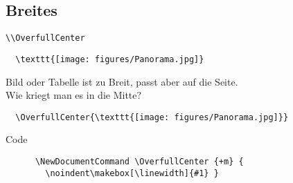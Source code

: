 \subsection{Breites}

\begin{frame}[fragile]{\lstinline+\\OverfullCenter+}
  \begin{lstlisting}
  \texttt{[image: figures/Panorama.jpg]}
  \end{lstlisting}

  \vspace{5pt}

  Bild oder Tabelle ist zu Breit, passt aber auf die Seite.\\
  Wie kriegt man es in die Mitte?

  \vspace{5pt}
  \begin{lstlisting}
  \OverfullCenter{\texttt{[image: figures/Panorama.jpg]}}
  \end{lstlisting}


  \begin{block}{Code}
    \begin{lstlisting}
      \NewDocumentCommand \OverfullCenter {+m} {
        \noindent\makebox[\linewidth]{#1} }
    \end{lstlisting}
  \end{block}
\end{frame}

